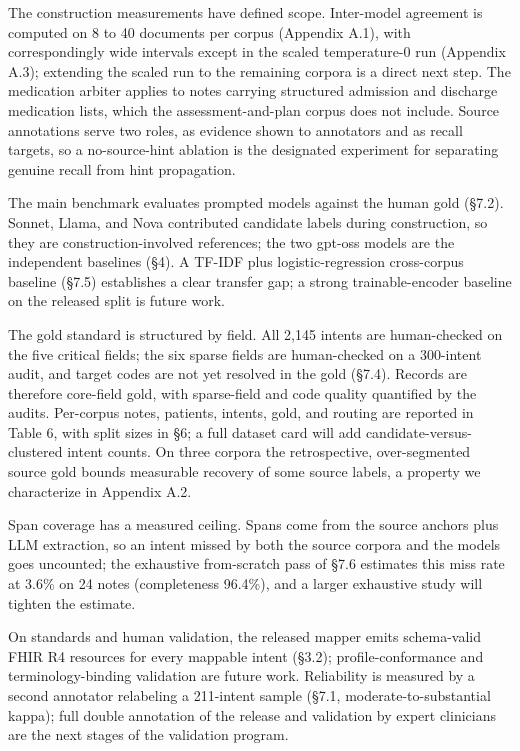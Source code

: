 The construction measurements have defined scope. Inter-model agreement is computed on 8 to 40 documents per corpus (Appendix A.1), with correspondingly wide intervals except in the scaled temperature-0 run (Appendix A.3); extending the scaled run to the remaining corpora is a direct next step. The medication arbiter applies to notes carrying structured admission and discharge medication lists, which the assessment-and-plan corpus does not include. Source annotations serve two roles, as evidence shown to annotators and as recall targets, so a no-source-hint ablation is the designated experiment for separating genuine recall from hint propagation.

The main benchmark evaluates prompted models against the human gold (§7.2). Sonnet, Llama, and Nova contributed candidate labels during construction, so they are construction-involved references; the two gpt-oss models are the independent baselines (§4). A TF-IDF plus logistic-regression cross-corpus baseline (§7.5) establishes a clear transfer gap; a strong trainable-encoder baseline on the released split is future work.

The gold standard is structured by field. All 2,145 intents are human-checked on the five critical fields; the six sparse fields are human-checked on a 300-intent audit, and target codes are not yet resolved in the gold (§7.4). Records are therefore core-field gold, with sparse-field and code quality quantified by the audits. Per-corpus notes, patients, intents, gold, and routing are reported in Table 6, with split sizes in §6; a full dataset card will add candidate-versus-clustered intent counts. On three corpora the retrospective, over-segmented source gold bounds measurable recovery of some source labels, a property we characterize in Appendix A.2.

Span coverage has a measured ceiling. Spans come from the source anchors plus LLM extraction, so an intent missed by both the source corpora and the models goes uncounted; the exhaustive from-scratch pass of §7.6 estimates this miss rate at 3.6\% on 24 notes (completeness 96.4\%), and a larger exhaustive study will tighten the estimate.

On standards and human validation, the released mapper emits schema-valid FHIR R4 resources for every mappable intent (§3.2); profile-conformance and terminology-binding validation are future work. Reliability is measured by a second annotator relabeling a 211-intent sample (§7.1, moderate-to-substantial kappa); full double annotation of the release and validation by expert clinicians are the next stages of the validation program.

